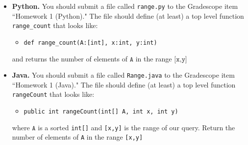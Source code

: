 \documentclass[11pt]{article}
\begin{document}
\begin{itemize}
	\item \textbf{Python.} You should submit a file called \texttt{range.py} to the Gradescope item ``Homework 1 (Python)." The file should define (at least) a top level function \texttt{range\_count} that looks like: 
    \begin{itemize}
        \item \verb|def range_count(A:[int], x:int, y:int)|
    \end{itemize}

	and returns the number of elements of $\texttt{A}$ in the range $\texttt{[x,y]}$
	
    \item \textbf{Java.} You should submit a file called \texttt{Range.java} to the Gradescope item ``Homework 1 (Java)." The file should define (at least) a top level function \texttt{rangeCount} that looks like: 
    \begin{itemize}
        \item \verb|public int rangeCount(int[] A, int x, int y)|
    \end{itemize}
    where $\texttt{A}$ is a sorted \verb|int[]| and \verb|[x,y]| is the range of our query. Return the number of elements of \verb|A| in the range \verb|[x,y]| 
\end{itemize}
\end{document}
